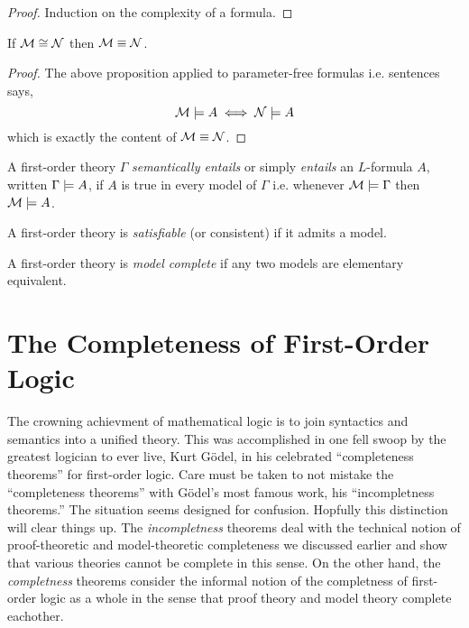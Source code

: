 \documentclass[12pt]{article}
\begin{document}
\begin{proof}
Induction on the complexity of a formula. 
\end{proof}

\begin{corollary}
If $\mathcal{M} \cong \mathcal{N}$ then $\mathcal{M} \equiv \mathcal{N}$.
\end{corollary}

\begin{proof}
The above proposition applied to parameter-free formulas i.e. sentences says,
\[ \mathcal{M} \models A \iff \mathcal{N} \models A \]
which is exactly the content of $\mathcal{M} \equiv \mathcal{N}$. 
\end{proof}

\begin{definition}
A first-order theory $\Gamma$ \textit{semantically entails} or simply \textit{entails} an $L$-formula $A$, written $\Gamma \models A$, if $A$ is true in every model of $\Gamma$ i.e. whenever $\mathcal{M} \models \Gamma$ then $\mathcal{M} \models A$.  
\end{definition}

\begin{definition}
A first-order theory is \textit{satisfiable} (or consistent) if it admits a model.  
\end{definition}

\begin{definition}
A first-order theory is \textit{model complete} if any two models are elementary equivalent.
\end{definition}


\section{The Completeness of First-Order Logic}

The crowning achievment of mathematical logic is to join syntactics and semantics into a unified theory. This was accomplished in one fell swoop by the greatest logician to ever live, Kurt G\"{o}del, in his celebrated ``completeness theorems'' for first-order logic. Care must be taken to not mistake the ``completeness theorems'' with G\"{o}del's most famous work, his ``incompletness theorems.'' The situation seems designed for confusion. Hopfully this distinction will clear things up. The \textit{incompletness} theorems deal with the technical notion of proof-theoretic and model-theoretic completeness we discussed earlier and show that various theories cannot be complete in this sense. On the other hand, the \textit{completness} theorems consider the informal notion of the completness of first-order logic as a whole in the sense that proof theory and model theory complete eachother. 
\end{document}
